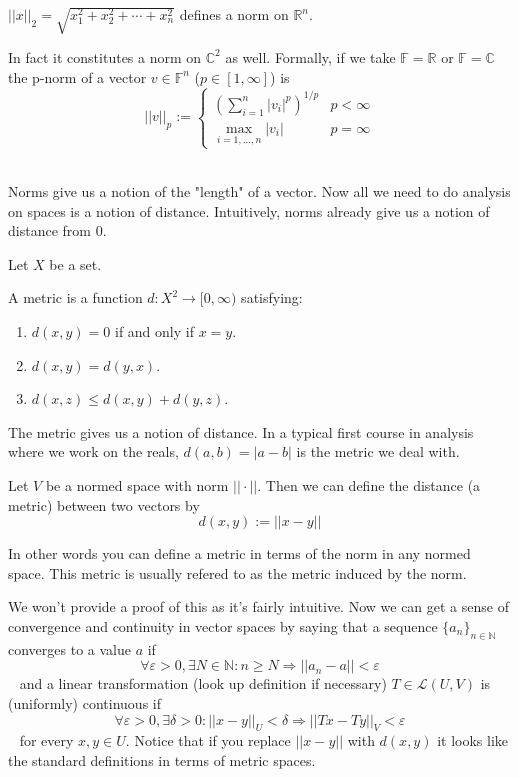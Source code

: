 \begin{ex}
    \label{ex:lp_norms}
    $||x||_2 = \sqrt{x_1^2 + x_2^2 + \cdots + x_n^2}$ defines 
    a norm on $\mathbb R^n$.

    In fact it constitutes a norm on $\mathbb C^2$ as well. 
    Formally, if we take $\mathbb F = \mathbb R$ or  
    $\mathbb F = \mathbb C$ the p-norm of a vector 
    $v \in \mathbb F^n$ ($p \in [1,\infty]$) is
    $$ 
        ||v||_p := 
        \begin{cases}
            \left(\displaystyle\sum_{i=1}^n |v_i|^p\right)^{1/p} & 
            p < \infty\\ 
            \max_{i=1,\dots,n}|v_i| & p = \infty
        \end{cases}
    $$ 
\end{ex}

Norms give us a notion of the "length" of a vector.  
Now all we need to do analysis on spaces is a notion of 
distance. Intuitively, norms already give us a notion of 
distance from $0$. 

\begin{defn}
    \label{defn:metric}
    Let $X$ be a set. 

    A metric is a function 
    $d:X^2 \to [0,\infty)$ satisfying: 
    \begin{enumerate}
        \item $d(x,y) = 0$ if and only if $x = y$. 
        \item $d(x,y) = d(y,x)$. 
        \item $d(x,z) \leq d(x,y) + d(y,z)$. 
    \end{enumerate}
\end{defn}

The metric gives us a notion of distance. 
In a typical first course in analysis where we work on 
the reals, $d(a,b) = |a - b|$ is the metric we deal with. 

\newpage 
\begin{prop}
    Let $V$ be a normed space with norm $||\cdot||$. 
    Then we can define the distance (a metric) between two vectors 
    by 
    $$ 
        d(x,y) := \left|\left| x - y \right|\right|
    $$ 

    In other words you can define a metric in terms of the norm 
    in any normed space. This metric is usually refered to 
    as the metric induced by the norm. 
\end{prop}

We won't provide a proof of this as it's fairly intuitive. 
Now we can get a sense of convergence and continuity in 
vector spaces by saying that a sequence $\{a_n\}_{n \in \mathbb N}$
converges to a value $a$ if 
$$ 
    \forall \varepsilon > 0, \exists N \in \mathbb N : 
    n \geq N \Rightarrow ||a_n - a || < \varepsilon 
$$ 
and a linear transformation (look up definition if necessary) 
$T \in \mathcal L(U,V)$ is (uniformly) continuous if 
$$ 
    \forall \varepsilon > 0, \exists \delta > 0 : 
    ||x - y||_U < \delta \Rightarrow 
    ||Tx - Ty||_V < \varepsilon
$$ 
for every $x,y \in U$. Notice that if you replace $||x-y||$ with 
$d(x,y)$ it looks like the standard definitions in terms 
of metric spaces. 

